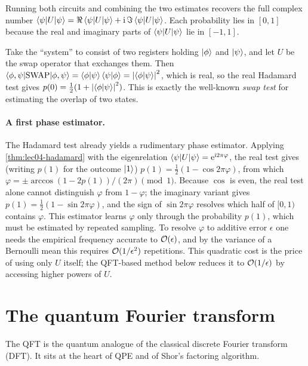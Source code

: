 Running both circuits and combining the two estimates recovers the full complex
number $\braket{\psi|U|\psi}=\Re\braket{\psi|U|\psi}+\mathrm{i}\,\Im\braket{\psi|U|\psi}$.
Each probability lies in $[0,1]$ because the real and imaginary parts of
$\braket{\psi|U|\psi}$ lie in $[-1,1]$.

\begin{remark}
\label{rem:lec04-swap}
Take the ``system'' to consist of two registers holding $\ket{\phi}$ and
$\ket{\psi}$, and let $U$ be the swap operator that exchanges them. Then
$\braket{\phi,\psi|\mathrm{SWAP}|\phi,\psi}=\braket{\phi|\psi}\braket{\psi|\phi}
=\left\lvert \braket{\phi|\psi} \right\rvert^{2}$, which is real, so the real Hadamard test gives
$p(0)=\tfrac12(1+\left\lvert \braket{\phi|\psi} \right\rvert^{2})$. This is exactly the well-known
\emph{swap test} for estimating the overlap of two states.
\end{remark}

\paragraph{A first phase estimator.}
The Hadamard test already yields a rudimentary phase estimator. Applying
\cref{thm:lec04-hadamard} with the eigenrelation
$\braket{\psi|U|\psi}=\mathrm{e}^{\mathrm{i} 2\pi\varphi}$, the real test gives (writing $p(1)$
for the outcome $\ket{1}$) $p(1)=\tfrac12(1-\cos 2\pi\varphi)$, from which
$\varphi=\pm\arccos(1-2p(1))/(2\pi)\pmod 1$. Because $\cos$ is even, the real
test alone cannot distinguish $\varphi$ from $1-\varphi$; the imaginary variant
gives $p(1)=\tfrac12(1-\sin 2\pi\varphi)$, and the sign of $\sin 2\pi\varphi$
resolves which half of $[0,1)$ contains $\varphi$. This estimator learns
$\varphi$ only through the probability $p(1)$, which must be estimated by
repeated sampling. To resolve $\varphi$ to additive error $\epsilon$ one needs
the empirical frequency accurate to $\mathcal{O}(\epsilon)$, and by the variance of a
Bernoulli mean this requires $\mathcal{O}(1/\epsilon^{2})$ repetitions. This quadratic
cost is the price of using only $U$ itself; the QFT-based method below reduces it
to $\mathcal{O}(1/\epsilon)$ by accessing higher powers of $U$.

\section{The quantum Fourier transform}
\label{sec:lec04-2}

The QFT is the quantum analogue of the classical discrete Fourier transform
(DFT). It sits at the heart of QPE and of Shor's factoring algorithm.

